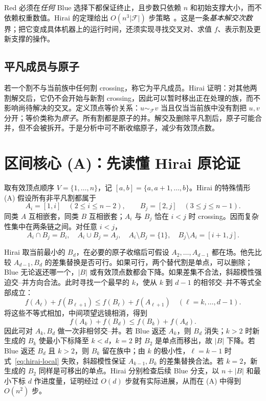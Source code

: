 \documentclass[UTF8,11pt,a4paper]{ctexart}
\newcommand{\calF}{\mathcal F}
\begin{document}
Red 必须在\emph{任何} Blue 选择下都保证终止，且步数只依赖 $n$ 和初始支撑大小，而不依赖权重数值。Hirai 的定理给出 $O(n^3|\calF|)$ 步策略~\cite{hirai}。这是一条\emph{基本解交次数}界；把它变成具体机器上的运行时间，还须实现寻找交叉对、求值 $f$、表示割及更新支撑的操作。

\subsection{平凡成员与原子}

若一个割不与当前族中任何割 crossing，称它为平凡成员。Hirai 证明：对其他两割解交后，它仍不会开始与新割 crossing，因此可以暂时移出正在处理的族，而不影响尚待解决的交叉。定义顶点等价关系：$u\sim_{\calF}v$ 当且仅当当前族中没有割把 $u,v$ 分开；等价类称为\emph{原子}。所有割都是原子的并。解交及删除平凡割后，原子可能合并，但不会被拆开。于是分析中可不断收缩原子，减少有效顶点数。

\section{区间核心 (A)：先读懂 Hirai 原论证}

\label{sec:caseA}
取有效顶点顺序 $V=\{1,\dots,n\}$，记 $[a,b]=\{a,a+1,\dots,b\}$。Hirai 的特殊情形 (A) 假设所有非平凡割都属于
\begin{equation}\label{eq:AB}
A_i=[1,i]\quad(2\le i\le n-2),\qquad
B_j=[2,j]\quad(3\le j\le n-1).
\end{equation}
同类 $A$ 互相嵌套，同类 $B$ 互相嵌套；$A_i$ 与 $B_j$ 恰在 $i<j$ 时 crossing。因而复杂性集中在两条链之间。对任意 $i<j$，
\begin{equation}\label{eq:AB-four}
A_i\cap B_j=B_i,\quad A_i\cup B_j=A_j,\quad
A_i\setminus B_j=\{1\},\quad B_j\setminus A_i=[i+1,j].
\end{equation}

Hirai 取当前最小的 $B_d$，在必要的原子收缩后可假设 $A_2,\ldots,A_{d-1}$ 都在场。他先比较 $A_{d-1},B_d$ 的差集替换是否可行。如果可行，两个替代割是单点，可以删除；Blue 无论返还哪一个，$|B|$ 或有效顶点数都会下降。如果差集不合法，斜超模性强迫交--并方向合法。此时寻找一个最早的 $k$，使从 $k$ 到 $d-1$ 的相邻交--并不等式全部成立：
\begin{equation}\label{eq:hirai-local}
f(A_\ell)+f(B_{\ell+1})\le f(B_\ell)+f(A_{\ell+1})
\quad(\ell=k,\ldots,d-1).
\end{equation}
将这些不等式相加，中间项望远镜相消，得到
\begin{equation}\label{eq:hirai-telescope}
f(A_k)+f(B_d)\le f(B_k)+f(A_d).
\end{equation}
因此可对 $A_k,B_d$ 做一次非相邻交--并。若 Blue 返还 $A_k$，则 $B_d$ 消失；$k>2$ 时新生成的 $B_k$ 使最小下标降至 $k<d$，$k=2$ 时 $B_2$ 是单点而移出，故 $|B|$ 下降。若 Blue 返还 $B_d$ 且 $k>2$，则 $B_k$ 留在族中；由 $k$ 的极小性，$\ell=k-1$ 时式~\eqref{eq:hirai-local} 失败，斜超模性保证 $A_{k-1},B_k$ 的差集替换合法。若 $k=2$，新生成的 $B_2$ 同样是可移出的单点。Hirai 分别检查后续 Blue 分支，以 $n+|B|$ 和最小下标 $d$ 作进度量，证明经过 $O(d)$ 步就有实际进展，从而在 (A) 中得到 $O(n^2)$ 步。
\end{document}
